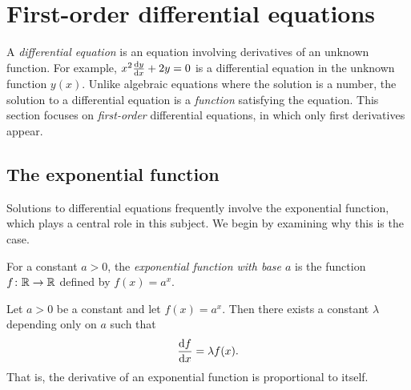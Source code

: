 \documentclass[a4paper]{article}
\begin{document}
\section{First-order differential equations}
A \emph{differential equation} is an equation involving derivatives of an unknown function. For example, $x^2\frac{\mathrm{d} y}{\mathrm{d} x} + 2y = 0$ is a differential equation in the unknown function $y(x)$. Unlike algebraic equations where the solution is a number, the solution to a differential equation is a \emph{function} satisfying the equation. This section focuses on \emph{first-order} differential equations, in which only first derivatives appear.

\subsection{The exponential function}

\begin{remark}
  Solutions to differential equations frequently involve the exponential function, which plays a central role in this subject. We begin by examining why this is the case.
\end{remark}

\begin{defi}
  For a constant $a > 0$, the \emph{exponential function with base $a$} is the function $f \colon \mathbb{R} \to \mathbb{R}$ defined by $f(x) = a^x$.
\end{defi}

\begin{center}
\end{center}

\begin{prop}\label{prop:exp-deriv-proportional}
  Let $a > 0$ be a constant and let $f(x) = a^x$. Then there exists a constant $\lambda$ depending only on $a$ such that
  \[
    \frac{\mathrm{d} f}{\mathrm{d} x} = \lambda f(x).
  \]
  That is, the derivative of an exponential function is proportional to itself.
\end{prop}
\end{document}
